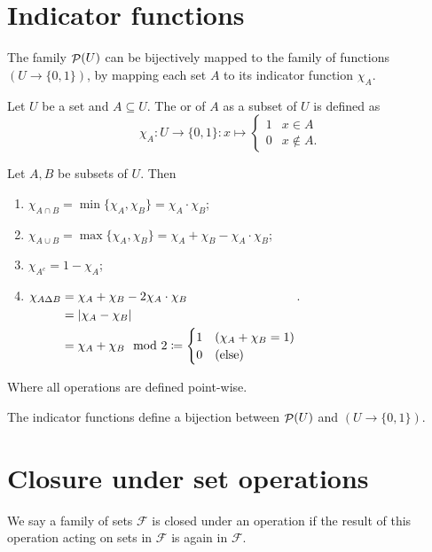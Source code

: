 \section{Indicator functions}
The family $\mathop{\mathcal{P}}(U)$ can be bijectively mapped to the family of functions $(U\to \{0,1\})$, by mapping each set $A$ to its indicator function $\chi_A$.

\begin{definition}
Let $U$ be a set and $A\subseteq U$. The  or  of $A$ as a subset of $U$ is defined as
\[ \chi_A: U\to \{0,1\}: x\mapsto \begin{cases}
1 & x\in A \\ 0 & x\notin A.
\end{cases} \]
\end{definition}
\begin{lemma}
Let $A,B$ be subsets of $U$. Then
\begin{enumerate}
\item $\chi_{A\cap B} = \min\{\chi_A,\chi_B\} = \chi_A\cdot \chi_B$;
\item $\chi_{A\cup B} = \max\{\chi_A,\chi_B\} = \chi_A + \chi_B - \chi_A\cdot \chi_B$;
\item $\chi_{A^c} = 1-\chi_A$;
\item $\chi_{A\Delta B} \begin{aligned}[t] &= \chi_A + \chi_B - 2\chi_A\cdot \chi_B \\
&= |\chi_A - \chi_B| \\
&= \chi_A + \chi_B \mod 2 \coloneqq \begin{cases}
1 & (\chi_A + \chi_B = 1) \\
0 & \text{(else)}
\end{cases}
\end{aligned}$.
\end{enumerate}
Where all operations are defined point-wise.
\end{lemma}

\begin{proposition}
The indicator functions define a bijection between $\mathop{\mathcal{P}}(U)$ and $(U\to \{0,1\})$.
\end{proposition}

\section{Closure under set operations}
We say a family of sets $\mathcal{F}$ is closed under an operation if the result of this operation acting on sets in $\mathcal{F}$ is again in $\mathcal{F}$.

